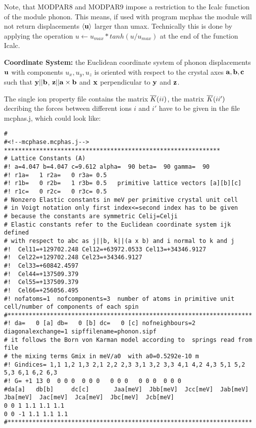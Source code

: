Note, that {\prg MODPAR8} and {\prg MODPAR9} impose a restriction to the {\prg Icalc} function
of the module {\prg phonon}. This means, if used with program {\prg mcphas} the
module will not return displacements $\langle \mathbf u \rangle$ larger than umax.
Technically this is done by applying the operation $u \leftarrow u_{max} * tanh (u/u_{max})$
at the end of the function {\prg Icalc}. 

{\bf Coordinate System:} the Euclidean coordinate system of phonon displacements $\mathbf u$ with
components $u_x,u_y,u_z$ is oriented with respect to the crystal axes $\mathbf a,\mathbf b, \mathbf c$
such that $\mathbf y || \mathbf b$, $\mathbf z || \mathbf a \times \mathbf b $ and $\mathbf x$ perpendicular
to $\mathbf y$ and $\mathbf z$.

The single ion property file contains the matrix $\overline{K}(ii)$, the matrix $\overline{K}(ii')$ decribing the
forces between
different ions $i$ and $i'$ have to be given in the file {\prg mcphas.j}, which could
look like:

\begin{verbatim}
# 
#<!--mcphase.mcphas.j-->
*************************************************************
# Lattice Constants (A)
#! a=4.047 b=4.047 c=9.612 alpha=  90 beta=  90 gamma=  90
#! r1a=   1 r2a=   0 r3a= 0.5
#! r1b=   0 r2b=   1 r3b= 0.5   primitive lattice vectors [a][b][c]
#! r1c=   0 r2c=   0 r3c= 0.5
# Nonzero Elastic constants in meV per primitive crystal unit cell 
# in Voigt notation only first index<=second index has to be given
# because the constants are symmetric Celij=Celji
# Elastic constants refer to the Euclidean coordinate system ijk defined
# with respect to abc as j||b, k||(a x b) and i normal to k and j
#!  Cel11=+129702.248 Cel12=+63972.0533 Cel13=+34346.9127
#!  Cel22=+129702.248 Cel23=+34346.9127
#!  Cel33=+60842.4597
#!  Cel44=+137509.379
#!  Cel55=+137509.379
#!  Cel66=+256056.495
#! nofatoms=1  nofcomponents=3  number of atoms in primitive unit cell/number of components of each spin
#*********************************************************************
#! da=   0 [a] db=   0 [b] dc=   0 [c] nofneighbours=2 diagonalexchange=1 sipffilename=phonon.sipf
# it follows the Born von Karman model according to  springs read from file 
# the mixing terms Gmix in meV/a0  with a0=0.5292e-10 m
#! Gindices= 1,1 1,2 1,3 2,1 2,2 2,3 3,1 3,2 3,3 4,1 4,2 4,3 5,1 5,2 5,3 6,1 6,2 6,3
#! G= +1 13 0  0 0 0  0 0 0   0 0 0   0 0 0  0 0 0
#da[a]   db[b]     dc[c]       Jaa[meV]  Jbb[meV]  Jcc[meV]  Jab[meV]  Jba[meV]  Jac[meV]  Jca[meV]  Jbc[meV]  Jcb[meV]
0 0 1 1.1 1.1 1.1
0 0 -1 1.1 1.1 1.1 
#*********************************************************************
\end{verbatim}

